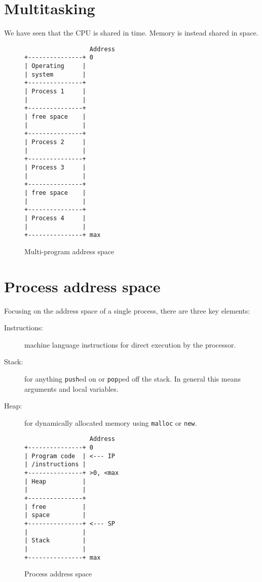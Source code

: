 \section{Multitasking}

We have seen that the CPU is shared in time.
Memory is instead shared in space.

\begin{figure}[htbp]
  \centering
\begin{verbatim}
                  Address
+---------------+ 0
| Operating     |
| system        |
+---------------+
| Process 1     |
|               |
+---------------+
| free space    |
|               |
+---------------+
| Process 2     |
|               |
+---------------+
| Process 3     |
|               |
+---------------+
| free space    |
|               |
+---------------+
| Process 4     |
|               |
+---------------+ max
\end{verbatim}
  \caption{Multi-program address space}
  \label{fig:multi-address-space}
\end{figure}


\section{Process address space}

Focusing on the address space of a single process, there are three key elements:
\begin{description}
\item[Instructions:] machine language instructions for direct execution by the processor.
\item[Stack:] for anything \texttt{push}ed on or \texttt{pop}ped off the stack. In general this means arguments and local variables.
\item[Heap:] for dynamically allocated memory using \texttt{malloc} or \texttt{new}.
\end{description}

\begin{figure}[htbp]
  \centering
\begin{verbatim}
                  Address
+---------------+ 0
| Program code  | <--- IP
| /instructions |
+---------------+ >0, <max
| Heap          |
|               |
+---------------+
| free          |
| space         |
+---------------+ <--- SP
|               |
| Stack         |
|               |
+---------------+ max
\end{verbatim}
  \caption{Process address space}
  \label{fig:process-address-space}
\end{figure}

